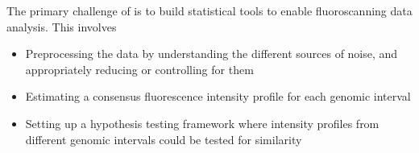 \begin{tcolorbox}[colback=green!5,colframe=green!40!black,title=Statistical challenges] %
The primary challenge of is to build statistical tools to enable fluoroscanning data analysis. This involves
\begin{itemize}
\item Preprocessing the data by understanding the different sources of noise, and appropriately reducing or controlling for them
\item Estimating a consensus fluorescence intensity profile for each genomic interval
\item Setting up a hypothesis testing framework where intensity profiles from different genomic intervals could be tested for similarity
\end{itemize}
\end{tcolorbox}


